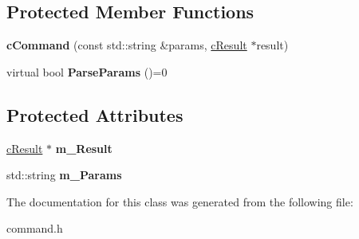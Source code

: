 \subsection*{\-Protected \-Member \-Functions}
\begin{DoxyCompactItemize}
\item 
\hypertarget{classengine_1_1cCommand_a707cca2e22af2cf15193c196acee8a01}{
{\bfseries c\-Command} (const std\-::string \&params, \hyperlink{classengine_1_1cResult}{c\-Result} $\ast$result)}
\label{classengine_1_1cCommand_a707cca2e22af2cf15193c196acee8a01}

\item 
\hypertarget{classengine_1_1cCommand_a0759953db8e00e72bd43998a2350f41e}{
virtual bool {\bfseries \-Parse\-Params} ()=0}
\label{classengine_1_1cCommand_a0759953db8e00e72bd43998a2350f41e}

\end{DoxyCompactItemize}
\subsection*{\-Protected \-Attributes}
\begin{DoxyCompactItemize}
\item 
\hypertarget{classengine_1_1cCommand_a4236eb109dbfe239d2780660c928ddea}{
\hyperlink{classengine_1_1cResult}{c\-Result} $\ast$ {\bfseries m\-\_\-\-Result}}
\label{classengine_1_1cCommand_a4236eb109dbfe239d2780660c928ddea}

\item 
\hypertarget{classengine_1_1cCommand_a7d9de283db6fc7ab54f7be40619552ac}{
std\-::string {\bfseries m\-\_\-\-Params}}
\label{classengine_1_1cCommand_a7d9de283db6fc7ab54f7be40619552ac}

\end{DoxyCompactItemize}


\-The documentation for this class was generated from the following file\-:\begin{DoxyCompactItemize}
\item 
command.\-h\end{DoxyCompactItemize}

